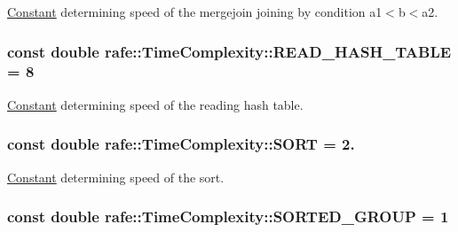 \hyperlink{classrafe_1_1_constant}{Constant} determining speed of the mergejoin joining by condition a1$<$b$<$a2. \hypertarget{classrafe_1_1_time_complexity_a61e08b141c8e61b50a980efc48d05cc2}{
\subsubsection[{R\+E\+A\+D\+\_\+\+H\+A\+S\+H\+\_\+\+T\+A\+B\+L\+E}]{\setlength{\rightskip}{0pt plus 5cm}const double rafe\+::\+Time\+Complexity\+::\+R\+E\+A\+D\+\_\+\+H\+A\+S\+H\+\_\+\+T\+A\+B\+L\+E = 8\hspace{0.3cm}{\ttfamily [static]}}}\label{classrafe_1_1_time_complexity_a61e08b141c8e61b50a980efc48d05cc2}
\hyperlink{classrafe_1_1_constant}{Constant} determining speed of the reading hash table. \hypertarget{classrafe_1_1_time_complexity_a4400cd269924110e53d97b3e074de846}{
\subsubsection[{S\+O\+R\+T}]{\setlength{\rightskip}{0pt plus 5cm}const double rafe\+::\+Time\+Complexity\+::\+S\+O\+R\+T = 2.\hspace{0.3cm}{\ttfamily [static]}}}\label{classrafe_1_1_time_complexity_a4400cd269924110e53d97b3e074de846}
\hyperlink{classrafe_1_1_constant}{Constant} determining speed of the sort. \hypertarget{classrafe_1_1_time_complexity_a0a177ac807f6258a6e2b53e0fb86a482}{
\subsubsection[{S\+O\+R\+T\+E\+D\+\_\+\+G\+R\+O\+U\+P}]{\setlength{\rightskip}{0pt plus 5cm}const double rafe\+::\+Time\+Complexity\+::\+S\+O\+R\+T\+E\+D\+\_\+\+G\+R\+O\+U\+P = 1\hspace{0.3cm}{\ttfamily [static]}}}\label{classrafe_1_1_time_complexity_a0a177ac807f6258a6e2b53e0fb86a482}
